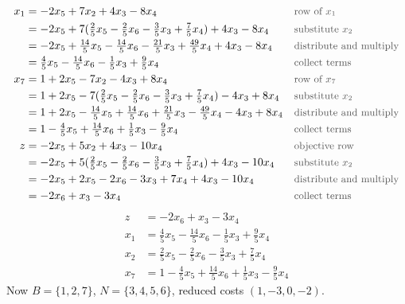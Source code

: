 \documentclass[a4paper,11pt]{article}
\newif\ifexplain
\newcommand{\why}[1]{\text{\small\color{black!65}#1}}
\newcommand{\explain}[1]{\ifexplain\begin{erklbox}#1\end{erklbox}\fi}
\begin{document}
\begin{align*}
x_1 &= -2x_5 + 7x_2 + 4x_3 - 8x_4 && \why{row of $x_1$}\\
&= -2x_5 + 7(\tfrac25 x_5 - \tfrac25 x_6 - \tfrac35 x_3 + \tfrac75 x_4) + 4x_3 - 8x_4 && \why{substitute $x_2$}\\
&= -2x_5+\tfrac{14}{5}x_5-\tfrac{14}{5}x_6-\tfrac{21}{5}x_3+\tfrac{49}{5}x_4+4x_3-8x_4 && \why{distribute and multiply}\\
&= \tfrac45 x_5 - \tfrac{14}{5} x_6 - \tfrac15 x_3 + \tfrac95 x_4 && \why{collect terms}\\
x_7 &= 1 + 2x_5 - 7x_2 - 4x_3 + 8x_4 && \why{row of $x_7$}\\
&=1+2x_5-7(\tfrac25x_5-\tfrac25x_6-\tfrac35x_3+\tfrac75x_4)-4x_3+8x_4 && \why{substitute $x_2$}\\
&=1+2x_5-\tfrac{14}{5}x_5+\tfrac{14}{5}x_6+\tfrac{21}{5}x_3-\tfrac{49}{5}x_4-4x_3+8x_4 && \why{distribute and multiply}\\
&= 1 - \tfrac45 x_5 + \tfrac{14}{5} x_6 + \tfrac15 x_3 - \tfrac95 x_4 && \why{collect terms}\\
z &= -2x_5 + 5x_2 + 4x_3 - 10x_4 && \why{objective row}\\
&= -2x_5 + 5(\tfrac25 x_5 - \tfrac25 x_6 - \tfrac35 x_3 + \tfrac75 x_4) + 4x_3 - 10x_4 && \why{substitute $x_2$}\\
&= -2x_5+2x_5-2x_6-3x_3+7x_4+4x_3-10x_4 && \why{distribute and multiply}\\
&= -2x_6 + x_3 - 3x_4 && \why{collect terms}
\end{align*}
\[
\begin{aligned}
z &= -2x_6 + x_3 - 3x_4\\
x_1 &= \tfrac45 x_5 - \tfrac{14}{5} x_6 - \tfrac15 x_3 + \tfrac95 x_4\\
x_2 &= \tfrac25 x_5 - \tfrac25 x_6 - \tfrac35 x_3 + \tfrac75 x_4\\
x_7 &= 1 - \tfrac45 x_5 + \tfrac{14}{5} x_6 + \tfrac15 x_3 - \tfrac95 x_4
\end{aligned}
\]
Now $B=\{1,2,7\}$, $N=\{3,4,5,6\}$, reduced costs $(1,-3,0,-2)$.

\explain{Hier wird die zweite Basiszeile nach $x_2$ aufgelöst. Beim Einsetzen müssen die Faktoren $7$ und $5$ jeweils die ganze Klammer multiplizieren. Auch dieser Schritt hat Länge null.}
\end{document}
